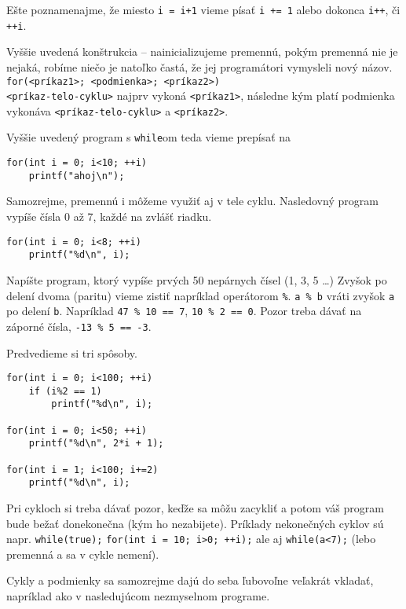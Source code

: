 Ešte poznamenajme, že miesto \verb!i = i+1! vieme písať \verb!i += 1! alebo
dokonca \verb!i++!, či \verb!++i!.

\medskip

Vyššie uvedená konštrukcia -- nainicializujeme premennú, pokým premenná nie je
nejaká, robíme niečo je natoľko častá, že jej programátori vymysleli nový
názov. \verb!for(<príkaz1>; <podmienka>; <príkaz2>)!\\ \verb!<príkaz-telo-cyklu>!
najprv vykoná \verb!<príkaz1>!, následne kým platí podmienka vykonáva
\verb!<príkaz-telo-cyklu>! a \verb!<príkaz2>!.

Vyššie uvedený program s \verb!while!om teda vieme prepísať na
\begin{lstlisting}
for(int i = 0; i<10; ++i)
    printf("ahoj\n");
\end{lstlisting}

Samozrejme, premennú i môžeme využiť aj v tele cyklu. Nasledovný program vypíše
čísla 0 až 7, každé na zvlášť riadku.
\begin{lstlisting}
for(int i = 0; i<8; ++i)
    printf("%d\n", i);
\end{lstlisting}

\cvicenie Napíšte program, ktorý vypíše prvých 50 nepárnych čísel (1, 3,
5 \dots) Zvyšok po delení dvoma (paritu) vieme zistiť napríklad operátorom \verb!%!.
\verb!a % b! vráti zvyšok \verb!a! po delení \verb!b!. Napríklad \verb!47 % 10 == 7!, \verb!10 % 2 == 0!.
Pozor treba dávať na záporné čísla, \verb!-13 % 5 == -3!.

\riesenie Predvedieme si tri spôsoby. 
\begin{lstlisting}
for(int i = 0; i<100; ++i)
    if (i%2 == 1)
        printf("%d\n", i);

for(int i = 0; i<50; ++i)
    printf("%d\n", 2*i + 1);

for(int i = 1; i<100; i+=2)
    printf("%d\n", i);
\end{lstlisting}

Pri cykloch si treba dávať pozor, keďže sa môžu zacykliť a potom váš program
bude bežať donekonečna (kým ho nezabijete).  Príklady nekonečných cyklov sú
napr. \verb!while(true);! \verb!for(int i = 10; i>0; ++i);! ale aj
\verb!while(a<7);! (lebo premenná a sa v cykle nemení).

\medskip

Cykly a podmienky sa samozrejme dajú do seba ľubovoľne veľakrát vkladať,
napríklad ako v nasledujúcom nezmyselnom programe.

